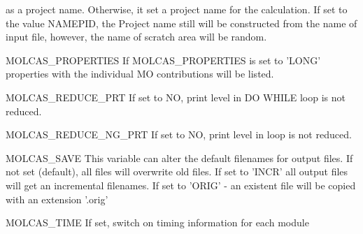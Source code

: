 \begin{variablelist}
as a project name. Otherwise, it set a project name for the calculation.
If set to the value NAMEPID, the Project name still will be constructed
from the name of input file, however, the name of scratch area will
be random.
\item[MOLCAS\_PROPERTIES]
If MOLCAS\_PROPERTIES is set to 'LONG' properties with the individual MO contributions will be listed.
\item[MOLCAS\_REDUCE\_PRT]
If set to NO, print level in DO WHILE loop is not reduced.
\item[MOLCAS\_REDUCE\_NG\_PRT]
If set to NO, print level in  loop is not reduced.
\item[MOLCAS\_SAVE]
This variable can alter the default filenames for output files.
If not set (default), all files will overwrite old files.
If set to 'INCR' all output files will get an incremental
filenames.
If set to 'ORIG' - an existent file will be copied with
an extension '.orig'

\item[MOLCAS\_TIME]
If set, switch on timing information for each module


\end{variablelist}
